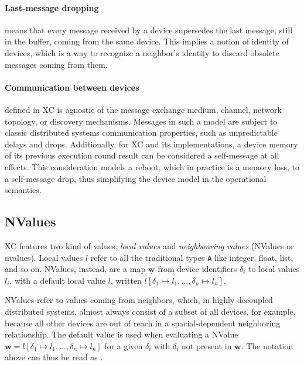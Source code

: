 \paragraph{Last-message dropping} means that every message received by a device supersedes the last message, still in the buffer, coming from the same device.\cite{xc}
%
This implies a notion of identity of devices, which is a way to recognize a neighbor's identity to discard obsolete messages coming from them.

\paragraph{Communication between devices} defined in \ac{XC} is agnostic of the message exchange medium, channel, network topology, or discovery mechanisms.
%
Messages in such a model are subject to classic distributed systems communication properties, such as unpredictable delays and drops\cite{xc}.
%
Additionally, for \ac{XC} and its implementations, a device memory of its previous execution round result can be considered a self-message at all effects.
%
This consideration models a reboot, which in practice is a memory loss, to a self-message drop, thus simplifying the device model in the operational semantics.

\subsection{NValues} \label{chap:background->sec:xc->subsec:nvalues}

\ac{XC} features two kind of values, \textit{local values} and \textit{neighbouring values} (NValues or nvalues).
%
Local values $l$ refer to all the traditional types \texttt{A} like integer, float, list, and so on.
%
NValues, instead, are a map $\underline{\mathbf{w}}$ from device identifiers $\delta_i$ to local values $l_i$, with a default local value $l$, written $l[\delta_1 \mapsto l_1, ..., \delta_n \mapsto l_n]$\cite{xc}.

NValues refer to values coming from neighbors, which, in highly decoupled distributed systems, almost always consist of a subset of all devices, for example, because all other devices are out of reach in a spacial-dependent neighboring relationship.
%
The default value is used when evaluating a NValue $\underline{\mathbf{w}} = l[\delta_1 \mapsto l_1, ..., \delta_n \mapsto l_n]$ for a given $\delta_i$ with $\delta_i$ not present in $\underline{\mathbf{w}}$.
%
The notation above can thus be read as \cite{xc}.

